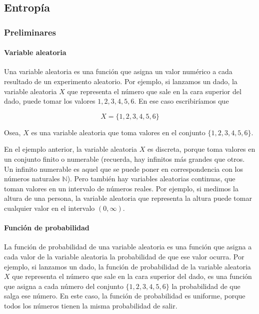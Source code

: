 \subsection{Entropía}\label{entropuxeda}

\subsubsection{Preliminares}\label{preliminares}

\paragraph{Variable aleatoria}\label{variable-aleatoria}

Una variable aleatoria es una función que asigna un valor numérico a
cada resultado de un experimento aleatorio. Por ejemplo, si lanzamos un
dado, la variable aleatoria \(X\) que representa el número que sale en
la cara superior del dado, puede tomar los valores \(1, 2, 3, 4, 5, 6\).
En ese caso escribiríamos que

\[
X = \{1,2,3,4,5,6\}
\]

Osea, \(X\) es una variable aleatoria que toma valores en el conjunto
\(\{1,2,3,4,5,6\}\).

En el ejemplo anterior, la variable aleatoria \(X\) es discreta, porque
toma valores en un conjunto finito o numerable (recuerda, hay infinitos
más grandes que otros. Un infinito numerable es aquel que se puede poner
en correspondencia con los números naturales \(\mathbb{N}\)). Pero
también hay variables aleatorias continuas, que toman valores en un
intervalo de números reales. Por ejemplo, si medimos la altura de una
persona, la variable aleatoria que representa la altura puede tomar
cualquier valor en el intervalo \((0,\infty)\).

\paragraph{Función de probabilidad}\label{funciuxf3n-de-probabilidad}

La función de probabilidad de una variable aleatoria es una función que
asigna a cada valor de la variable aleatoria la probabilidad de que ese
valor ocurra. Por ejemplo, si lanzamos un dado, la función de
probabilidad de la variable aleatoria \(X\) que representa el número que
sale en la cara superior del dado, es una función que asigna a cada
número del conjunto \(\{1,2,3,4,5,6\}\) la probabilidad de que salga ese
número. En este caso, la función de probabilidad es uniforme, porque
todos los números tienen la misma probabilidad de salir.


